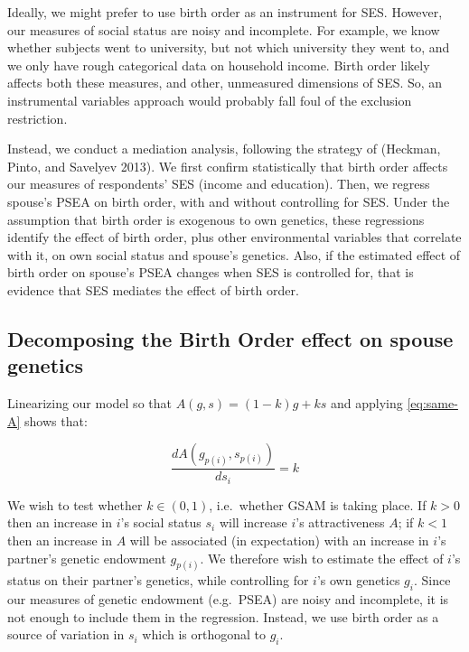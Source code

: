 \documentclass[
]{article}
\begin{document}
Ideally, we might prefer to use birth order as an instrument for SES.
However, our measures of social status are noisy and incomplete. For
example, we know whether subjects went to university, but not which
university they went to, and we only have rough categorical data on
household income. Birth order likely affects both these measures, and
other, unmeasured dimensions of SES. So, an instrumental variables
approach would probably fall foul of the exclusion restriction.

Instead, we conduct a mediation analysis, following the strategy of
(Heckman, Pinto, and Savelyev 2013). We first confirm statistically that birth
order affects our measures of respondents' SES (income and education).
Then, we regress spouse's PSEA on birth order, with and without
controlling for SES. Under the assumption that birth order is exogenous
to own genetics, these regressions identify the effect of birth order,
plus other environmental variables that correlate with it, on own social
status and spouse's genetics. Also, if the estimated effect of birth
order on spouse's PSEA changes when SES is controlled for, that is
evidence that SES mediates the effect of birth order.

\hypertarget{decomposing-the-birth-order-effect-on-spouse-genetics}{%
\subsection{Decomposing the Birth Order effect on spouse genetics}\label{decomposing-the-birth-order-effect-on-spouse-genetics}}

Linearizing our model so that \(A(g, s) = (1-k)g + ks\) and applying
\eqref{eq:same-A} shows that:

\[
\frac{d A(g_{p(i)}, s_{p(i)})}{d s_i} = k
\]

We wish to test whether \(k \in (0, 1)\), i.e.~whether GSAM is taking
place. If \(k > 0\) then an increase in \(i\)'s social status \(s_i\) will
increase \(i\)'s attractiveness \(A\); if \(k < 1\) then an increase in \(A\)
will be associated (in expectation) with an increase in \(i\)'s partner's
genetic endowment \(g_{p(i)}\). We therefore wish to estimate the effect
of \(i\)'s status on their partner's genetics, while controlling for \(i\)'s
own genetics \(g_i\). Since our measures of genetic endowment (e.g.~PSEA)
are noisy and incomplete, it is not enough to include them in the
regression. Instead, we use birth order as a source of variation in
\(s_i\) which is orthogonal to \(g_i\).
\end{document}
